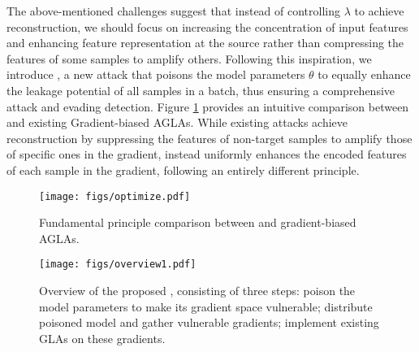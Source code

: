 The above-mentioned challenges suggest that instead of controlling $\lambda$ to achieve reconstruction, we should focus on increasing the concentration of input features and enhancing feature representation at the source rather than compressing the features of some samples to amplify others. Following this inspiration, we introduce \name, a new attack that poisons the model parameters $\theta$ to equally enhance the leakage potential of all samples in a batch, thus ensuring a comprehensive attack and evading detection.
Figure \ref{showchallenges} provides an intuitive comparison between \name and existing Gradient-biased AGLAs. While existing attacks achieve reconstruction by suppressing the features of non-target samples to amplify those of specific ones in the gradient, \name instead uniformly enhances the encoded features of each sample in the gradient, following an entirely different principle.
\begin{figure}[t]
    \centering
    \vspace{0.0cm}  %
    \texttt{[image: figs/optimize.pdf]}
    \caption{Fundamental principle comparison between \name and gradient-biased AGLAs.}
    \label{showchallenges}
\end{figure}
\begin{figure*}[t]
    \centering
    \vspace{0.0cm}  %
    \texttt{[image: figs/overview1.pdf]}
    \caption{Overview of the proposed \name, consisting of three steps:  poison the model parameters to make its gradient space vulnerable;  distribute poisoned model and gather vulnerable gradients;  implement existing GLAs on these gradients.}
    \label{EGGVoverview}
\end{figure*}
